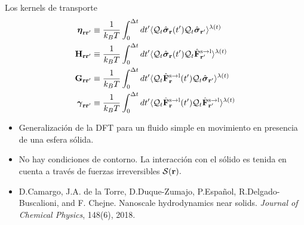 \documentclass{beamer}
\begin{document}
\begin{frame}{Los kernels de transporte}
\begin{align}
  \boldsymbol{\eta}_{{\bf  r}{\bf r}'} &\equiv
\frac{1}{k_BT}\int_0^{\Delta t} dt'\langle 
{\cal Q}_t\hat{\boldsymbol{\sigma}}_{{\bf r}}(t')
{\cal Q}_t\hat{\boldsymbol{\sigma}}_{{\bf r}'}\rangle^{\lambda(t)}
\nonumber \\
{\bf H}_{{\bf r}{\bf r}'}&\equiv\frac{1}{k_BT}\int_0^{\Delta t} dt'
\langle {\cal Q}_t\hat{\boldsymbol{\sigma}}_{{\bf r}}(t')
{\cal Q}_t\hat{\bf F}^{\rm s\to l}_{{\bf r}'}\rangle^{\lambda(t)}
\nonumber\\
{\bf G}_{{\bf r}{\bf r}'}&\equiv\frac{1}{k_BT}\int_0^{\Delta t} dt'
\langle {\cal Q}_t\hat{\bf F}^{\rm s\to l}_{{\bf r}}(t')
{\cal Q}_t\hat{\boldsymbol{\sigma}}_{{\bf r}'}\rangle^{\lambda(t)}
\nonumber\\
\boldsymbol{\gamma}_{{\bf  r}{\bf r}'}&\equiv\frac{1}{k_BT}\int_0^{\Delta t} dt'
\langle 
{\cal Q}_t\hat{\bf F}^{\rm s\to l}_{{\bf r}}(t')
{\cal Q}_t\hat{\bf F}^{\rm s\to l}_{{\bf r}'}\rangle^{\lambda(t)}
\nonumber
\end{align}
\end{frame}

\begin{frame}
  \begin{itemize}
    \item<1-> \alert{Generalización de la DFT} para un fluido simple en movimiento en presencia de una esfera sólida. 
    \item<2-> No hay condiciones de contorno. La interacción con el sólido es tenida en cuenta a través de \alert{fuerzas irreversibles} $\cal{S}({\bf r}).$ 
    \item<3-> D.Camargo, J.A. de la Torre,  D.Duque-Zumajo, P.Espa\~nol, R.Delgado-Buscalioni, and F. Chejne. Nanoscale hydrodynamics near solids. \textit{Journal of Chemical Physics}, 148(6), 2018.
  \end{itemize}

\end{frame}


\end{document}
